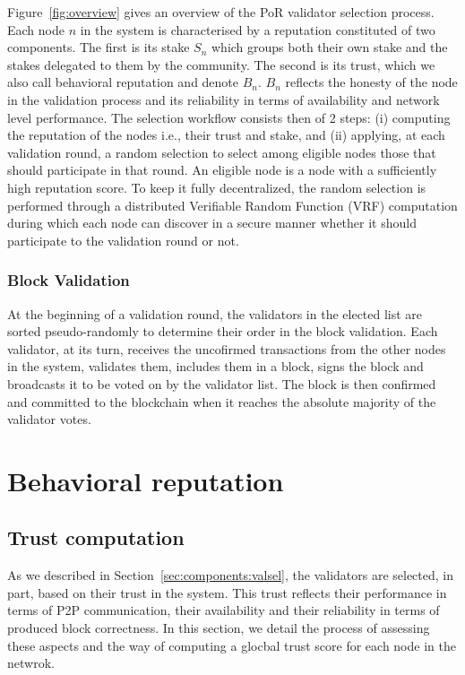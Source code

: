 \documentclass[]{article}
\begin{document}
Figure~\ref{fig:overview} gives an overview of the PoR validator selection process. Each node $n$ in the system is characterised by a reputation constituted of two components. The first is its stake $S_n$ which groups both their own stake and the stakes delegated to them by the community. The second is its trust, which we also call behavioral reputation and denote $B_n$. $B_n$ reflects the honesty of the node in the validation process and its reliability in terms of availability and network level performance. The selection workflow consists then of 2 steps: (i) computing the reputation of the nodes i.e., their trust and stake, and (ii) applying, at each validation round, a random selection to select among eligible nodes those that should participate in that round.  An eligible node is a node with a sufficiently high reputation score. 
To keep it fully decentralized, the random selection is performed through a distributed Verifiable Random Function (VRF) computation during which each node can discover in a secure manner whether it should participate to the validation round or not.  

\subsubsection{Block Validation}
\label{sec:components:blockval}
At the beginning of a validation round, the validators in the elected list are sorted pseudo-randomly to determine their order in the  block validation. Each validator, at its turn, receives the uncofirmed transactions from the other nodes in the system, validates them, includes them in a block, signs the block and broadcasts it to be voted on by the validator list. The block is then confirmed and committed to the blockchain when it reaches the absolute majority of the validator votes.      

\section{Behavioral reputation}
\label{sec:behavior}

\subsection{Trust computation}
As we described in Section~\ref{sec:components:valsel}, the validators are selected, in part, based on their trust in the system. This trust reflects their performance in terms of P2P communication, their availability and their reliability in terms of produced block correctness. In this section, we detail the process of assessing these aspects and the way of computing a glocbal trust score for each node in the netwrok.   
\end{document}
